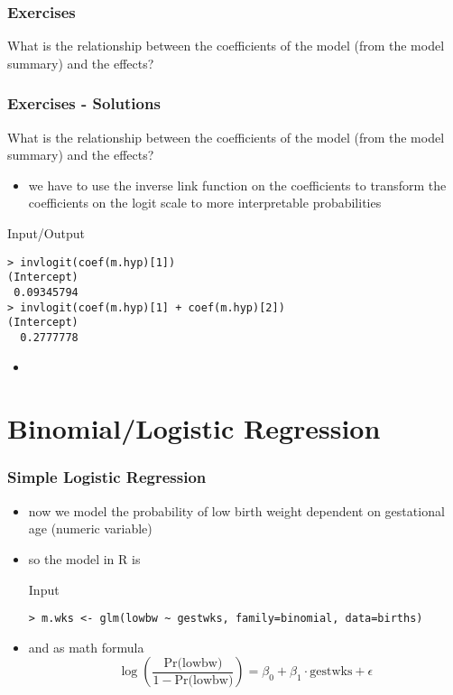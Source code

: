 \begin{frame}[fragile]\frametitle{Exercises}
  What is the relationship between the coefficients of the model (from the model summary) and the effects?
\end{frame}


\begin{frame}[fragile]\frametitle{Exercises - Solutions}
  What is the relationship between the coefficients of the model (from the model summary) and the effects?
  \begin{itemize}
  \item we have to use the inverse link function on the coefficients to transform the coefficients on the logit scale to more interpretable probabilities
  \end{itemize}
  \begin{exampleblock}{Input/Output}
\begin{verbatim}
> invlogit(coef(m.hyp)[1])
(Intercept) 
 0.09345794 
> invlogit(coef(m.hyp)[1] + coef(m.hyp)[2])
(Intercept) 
  0.2777778 
\end{verbatim}
  \end{exampleblock}
  \begin{itemize}
\item 
\end{itemize}
\end{frame}


\section{Binomial/Logistic Regression}

\begin{frame}[fragile]\frametitle{Simple Logistic Regression}
\begin{itemize}
\item now we model the probability of low birth weight dependent on gestational age (numeric variable)
\item so the model in R is 
  \begin{exampleblock}{Input}\footnotesize
\begin{verbatim}
> m.wks <- glm(lowbw ~ gestwks, family=binomial, data=births)
\end{verbatim}
  \end{exampleblock}\normalsize
\item and as math formula
$$ \log\left(\frac{\mbox{Pr(lowbw)}}{1-\mbox{Pr(lowbw)}}\right) = \beta_0 + \beta_1 \cdot \mbox{gestwks} + \epsilon$$
\end{itemize}
\end{frame}


